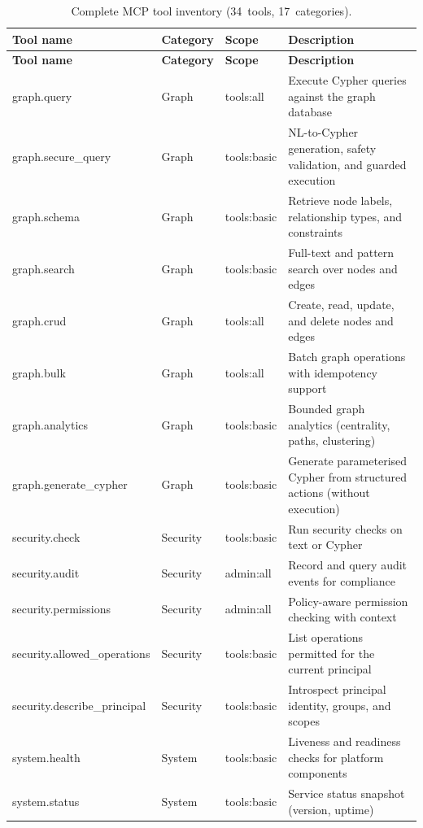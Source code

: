 \documentclass[a4paper]{sapthesis}
\begin{document}
{\footnotesize
\begin{longtable}{@{}l l l p{4.0cm}@{}}
\caption{Complete MCP tool inventory (34~tools, 17~categories).}
\label{tab:app-tool-inventory} \\
\hline
\textbf{Tool name} & \textbf{Category} & \textbf{Scope} &
    \textbf{Description} \\
\hline
\endfirsthead
\hline
\textbf{Tool name} & \textbf{Category} & \textbf{Scope} &
    \textbf{Description} \\
\hline
\endhead
\hline
\endfoot
graph.query          & Graph & tools:all   & Execute Cypher queries against the graph database \\
graph.secure\_query  & Graph & tools:basic & NL-to-Cypher generation, safety validation, and guarded execution \\
graph.schema         & Graph & tools:basic & Retrieve node labels, relationship types, and constraints \\
graph.search         & Graph & tools:basic & Full-text and pattern search over nodes and edges \\
graph.crud           & Graph & tools:all   & Create, read, update, and delete nodes and edges \\
graph.bulk           & Graph & tools:all   & Batch graph operations with idempotency support \\
graph.analytics      & Graph & tools:basic & Bounded graph analytics (centrality, paths, clustering) \\
graph.generate\_cypher & Graph & tools:basic & Generate parameterised Cypher from structured actions (without execution) \\
\hline
security.check              & Security & tools:basic & Run security checks on text or Cypher \\
security.audit              & Security & admin:all   & Record and query audit events for compliance \\
security.permissions        & Security & admin:all   & Policy-aware permission checking with context \\
security.allowed\_operations & Security & tools:basic & List operations permitted for the current principal \\
security.describe\_principal & Security & tools:basic & Introspect principal identity, groups, and scopes \\
\hline
system.health  & System & tools:basic & Liveness and readiness checks for platform components \\
system.status  & System & tools:basic & Service status snapshot (version, uptime) \\

\end{longtable}}
\end{document}
